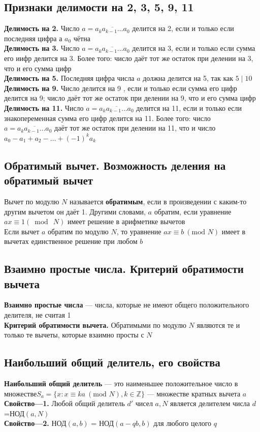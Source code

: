 \documentclass[a4paper]{article}
\begin{document}
\subsection{Признаки делимости на 2, 3, 5, 9, 11}
\textbf{Делимость на 2.} Число $a=\overline{a_{k} a_{k-1} \ldots a_{0}}$ делится на 2, если и только если последняя цифра а $a_{0}$ чётна\\[2mm]
\indent\textbf{Делимость на 3.} Число $a=\overline{a_{k} a_{k-1} \ldots a_{0}}$ делится на 3, если и только если сумма его иифр делится на 3. Более того: число даёт тот же остаток при делении на 3, что и его сумма цифр\\[2mm]
\indent\textbf{Делимость на 5.} Последняя цифра числа $a$ должна делится на 5, так как $5 \mid 10$\\[2mm]
\indent\textbf{Делимость на 9.} Число делится на 9 , если и только если сумма его цифр делится на 9; число даёт тот же остаток при делении на 9, что и его сумма цифр\\[2mm]
\indent\textbf{Делимость на 11.} Число $a=\overline{a_{k} a_{k-1} \ldots a_{0}}$ делится на 11, если и только если знакопеременная сумма его цифр делится на 11. Более того: число $a=\overline{a_{k} a_{k-1} \ldots a_{0}}$ даёт тот же остаток при делении на 11, что и число $a_{0}-a_{1}+a_{2}-\ldots+(-1)^{k} a_{k}$

\subsection{Обратимый вычет. Возможность деления на обратимый вычет}
Вычет по модулю $N$ называется \textbf{обратимым}, если в произведении с каким-то другим вычетом он даёт 1. Другими словами, $a$ обратим, если уравнение $a x \equiv 1(\bmod\ N)$ имеет решение в арифметике вычетов\\[2mm]
\indent Если вычет $a$ обратим по модулю $N$, то уравнение $ax \equiv b\ (\text{mod } N)$ имеет в вычетах единственное решение при любом $b$

\subsection{Взаимно простые числа. Критерий обратимости вычета}
\textbf{Взаимно простые числа} — числа, которые не имеют общего положительного делителя, не считая 1\\[2mm]
\indent\textbf{Критерий обратимости вычета.} Обратимыми по модулю $N$ являются те и только те вычеты, которые взаимно просты с $N$

\subsection{Наибольший общий делитель, его свойства}
\textbf{Наибольший общий делитель} — это наименьшее положительное число в множестве\newline $S_a=\{x:x\equiv ka\ (\text{mod }N), k\in\mathbb{Z}\}$ — множестве кратных вычета $a$\\[2mm]
\indent\textbf{Свойство—1.} Любой общий делитель $d'$ чисел $a, N$ является делителем числа $d$=НОД$(a,N)$\\[2mm]
\indent\textbf{Свойство—2.} НОД$(a, b)$ = НОД$(a-qb, b)$ для любого целого $q$
\end{document}
